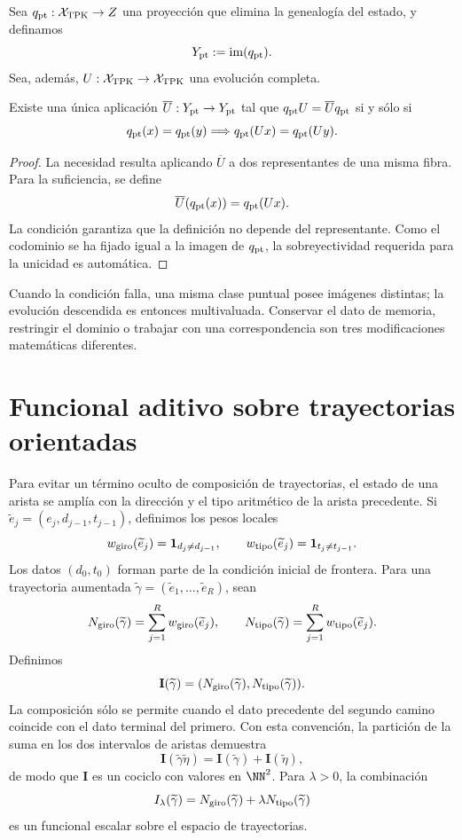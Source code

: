 Sea \(q_{\rm pt}:\mathcal X_{\rm TPK}\to Z\) una proyección que elimina la
genealogía del estado, y definamos
\[
 Y_{\rm pt}:=\operatorname{im}(q_{\rm pt}).
\]
Sea, además, \(U:\mathcal X_{\rm TPK}\to\mathcal X_{\rm TPK}\) una
evolución completa.

\begin{theorem}
Existe una única aplicación
\(\overline U:Y_{\rm pt}\to Y_{\rm pt}\) tal que
\(q_{\rm pt}U=\overline Uq_{\rm pt}\) si y sólo si
\[
 q_{\rm pt}(x)=q_{\rm pt}(y)
 \Longrightarrow q_{\rm pt}(Ux)=q_{\rm pt}(Uy).
\]
\end{theorem}
\begin{proof}
La necesidad resulta aplicando \(\overline U\) a dos representantes de una
misma fibra. Para la suficiencia, se define
\[
 \overline U(q_{\rm pt}(x))=q_{\rm pt}(Ux).
\]
La condición garantiza que la definición no depende del representante. Como
el codominio se ha fijado igual a la imagen de \(q_{\rm pt}\), la
sobreyectividad requerida para la unicidad es automática.
\end{proof}

Cuando la condición falla, una misma clase puntual posee imágenes distintas;
la evolución descendida es entonces multivaluada. Conservar el dato de
memoria, restringir el dominio o trabajar con una correspondencia son tres
modificaciones matemáticas diferentes.

\section{Funcional aditivo sobre trayectorias orientadas}

Para evitar un término oculto de composición de trayectorias, el estado de una arista se
amplía con la dirección y el tipo aritmético de la arista precedente. Si
\(\widetilde e_j=(e_j,d_{j-1},t_{j-1})\), definimos los pesos locales
\[
 w_{\rm giro}(\widetilde e_j)=\mathbf1_{d_j\ne d_{j-1}},
 \qquad
 w_{\rm tipo}(\widetilde e_j)=\mathbf1_{t_j\ne t_{j-1}}.
\]
Los datos \((d_0,t_0)\) forman parte de la condición inicial de frontera.
Para una trayectoria aumentada
\(\widetilde\gamma=(\widetilde e_1,\ldots,\widetilde e_R)\), sean
\[
 N_{\rm giro}(\widetilde\gamma)=\sum_{j=1}^R
 w_{\rm giro}(\widetilde e_j),
 \qquad
 N_{\rm tipo}(\widetilde\gamma)=\sum_{j=1}^R
 w_{\rm tipo}(\widetilde e_j).
\]
Definimos
\[
 \mathbf I(\widetilde\gamma)=
 (N_{\rm giro}(\widetilde\gamma),N_{\rm tipo}(\widetilde\gamma)).
\]
La composición sólo se permite cuando el dato precedente del segundo camino
coincide con el dato terminal del primero. Con esta convención, la partición
de la suma en los dos intervalos de aristas demuestra
\[
 \mathbf I(\widetilde\gamma\widetilde\eta)
 =\mathbf I(\widetilde\gamma)+\mathbf I(\widetilde\eta),
\]
de modo que \(\mathbf I\) es un cociclo con valores en \(\NN^2\). Para
\(\lambda>0\), la combinación
\[
 I_\lambda(\widetilde\gamma)
 =N_{\rm giro}(\widetilde\gamma)
 +\lambda N_{\rm tipo}(\widetilde\gamma)
\]
es un funcional escalar sobre el espacio de trayectorias.

